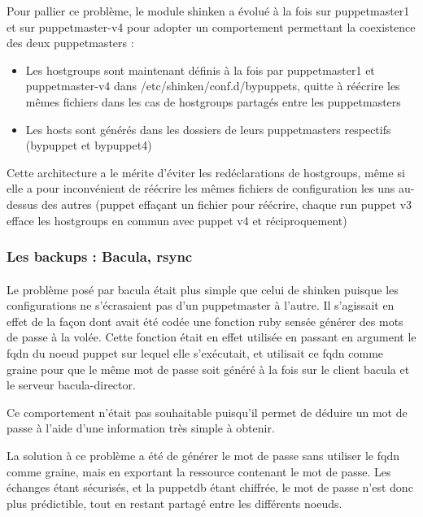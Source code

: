 \documentclass[14 pt]{extreport}
\begin{document}
Pour pallier ce problème, le module shinken a évolué à la fois sur puppetmaster1 et sur puppetmaster-v4 pour adopter un comportement permettant la coexistence des deux puppetmasters :

\begin{itemize}
	\item Les hostgroups sont maintenant définis à la fois par puppetmaster1 et puppetmaster-v4 dans /etc/shinken/conf.d/bypuppets, quitte à réécrire les mêmes fichiers dans les cas de hostgroups partagés entre les puppetmasters
	\item Les hosts sont générés dans les dossiers de leurs puppetmasters respectifs (bypuppet et bypuppet4)
\end{itemize}

Cette architecture a le mérite d'éviter les redéclarations de hostgroups, même si elle a pour inconvénient de réécrire les mêmes fichiers de configuration les uns au-dessus des autres (puppet effaçant un fichier pour réécrire, chaque run puppet v3 efface les hostgroups en commun avec puppet v4 et réciproquement)

\subsubsection{Les backups : Bacula, rsync}

\paragraph*{}Le problème posé par bacula était plus simple que celui de shinken puisque les configurations ne s'écrasaient pas d'un puppetmaster à l'autre. Il s'agissait en effet de la façon dont avait été codée une fonction ruby sensée générer des mots de passe à la volée. Cette fonction était en effet utilisée en passant en argument le fqdn du noeud puppet sur lequel elle s'exécutait, et utilisait ce fqdn comme graine pour que le même mot de passe soit généré à la fois sur le client bacula et le serveur bacula-director.

Ce comportement n'était pas souhaitable puisqu'il permet de déduire un mot de passe à l'aide d'une information très simple à obtenir.

La solution à ce problème a été de générer le mot de passe sans utiliser le fqdn comme graine, mais en exportant la ressource contenant le mot de passe. Les échanges étant sécurisés, et la puppetdb étant chiffrée, le mot de passe n'est donc plus prédictible, tout en restant partagé entre les différents noeuds.
\end{document}

